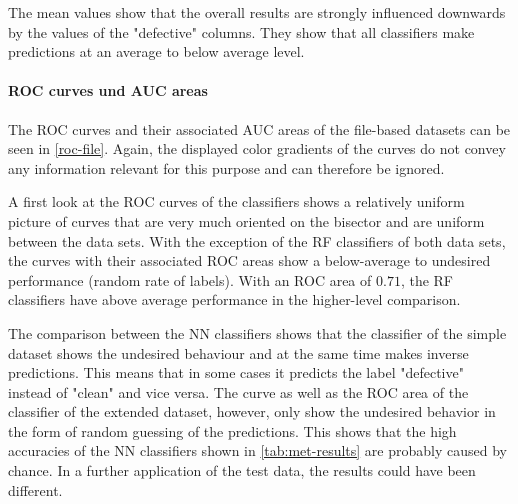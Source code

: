The mean values show that the overall results are strongly influenced downwards by the values of the "defective" columns. They show that all classifiers make predictions at an average to below average level.

\paragraph{ROC curves und AUC areas}

The ROC curves and their associated AUC areas of the file-based datasets can be seen in \autoref{roc-file}. Again, the displayed color gradients of the curves do not convey any information relevant for this purpose and can therefore be ignored.

A first look at the ROC curves of the classifiers shows a relatively uniform picture of curves that are very much oriented on the bisector and are uniform between the data sets. With the exception of the RF classifiers of both data sets, the curves with their associated ROC areas show a below-average to undesired performance (random rate of labels). With an ROC area of $0.71$, the RF classifiers have above average performance in the higher-level comparison.

The comparison between the NN classifiers shows that the classifier of the simple dataset shows the undesired behaviour and at the same time makes inverse predictions. This means that in some cases it predicts the label "defective" instead of "clean" and vice versa. The curve as well as the ROC area of the classifier of the extended dataset, however, only show the undesired behavior in the form of random guessing of the predictions. This shows that the high accuracies of the NN classifiers shown in \autoref{tab:met-results} are probably caused by chance. In a further application of the test data, the results could have been different.

